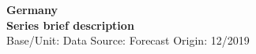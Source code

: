 \documentclass[a4paper,12pt]{article}
\begin{document}
\thispagestyle{empty}
\begin{landscape}
\begin{center}

\textbf{Germany} \\ 

\textbf{Series brief description} \\ 

Base/Unit: 
\space \space \space Data Source:  
\space \space \space Forecast Origin: 12/2019 \\ 
\end{center}

\begin{small}   \end{small} 

\end{landscape}
\end{document}
